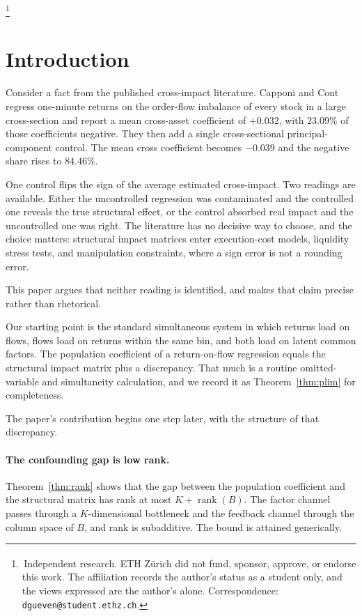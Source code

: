 \documentclass[10pt,twocolumn]{article}
\newcommand\daggerfootnote[1]{%
  \begingroup
  \renewcommand\thefootnote{}\footnote{#1}%
  \addtocounter{footnote}{-1}%
  \endgroup
}
\theoremstyle{remark}
\newcommand{\rank}{\operatorname{rank}}
\begin{document}
\thispagestyle{fancy}

\daggerfootnote{\textsuperscript{\dag}\,Independent research. ETH Z\"urich did
not fund, sponsor, approve, or endorse this work. The affiliation records the
author's status as a student only, and the views expressed are the author's
alone. Correspondence: \texttt{dgueven@student.ethz.ch}.}

\section{Introduction}

Consider a fact from the published cross-impact literature. Capponi and Cont
\cite{CapponiCont2020} regress one-minute returns on the order-flow imbalance
of every stock in a large cross-section and report a mean cross-asset
coefficient of $+0.032$, with $23.09\%$ of those coefficients negative. They
then add a single cross-sectional principal-component control. The mean cross
coefficient becomes $-0.039$ and the negative share rises to $84.46\%$.

One control flips the sign of the average estimated cross-impact. Two readings
are available. Either the uncontrolled regression was contaminated and the
controlled one reveals the true structural effect, or the control absorbed real
impact and the uncontrolled one was right. The literature has no decisive way
to choose, and the choice matters: structural impact matrices enter
execution-cost models, liquidity stress tests, and manipulation constraints,
where a sign error is not a rounding error.

This paper argues that neither reading is identified, and makes that claim
precise rather than rhetorical.

Our starting point is the standard simultaneous system in which returns load on
flows, flows load on returns within the same bin, and both load on latent
common factors. The population coefficient of a return-on-flow regression
equals the structural impact matrix plus a discrepancy. That much is a routine
omitted-variable and simultaneity calculation, and we record it as
Theorem~\ref{thm:plim} for completeness.

The paper's contribution begins one step later, with the structure of that
discrepancy.

\paragraph{The confounding gap is low rank.}
Theorem~\ref{thm:rank} shows that the gap between the population coefficient
and the structural matrix has rank at most $K+\rank(B)$. The factor channel
passes through a $K$-dimensional bottleneck and the feedback channel through
the column space of $B$, and rank is subadditive. The bound is attained
generically.
\end{document}
